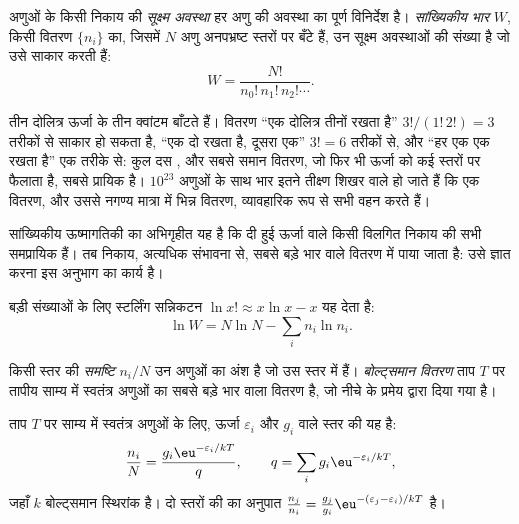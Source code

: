 \begin{definition}[सूक्ष्म अवस्था, सांख्यिकीय भार]\label{def:b3:partition-functions:microstate}
अणुओं के किसी निकाय की \emph{सूक्ष्म अवस्था} हर अणु की
अवस्था का पूर्ण विनिर्देश है। \emph{सांख्यिकीय भार} $W$, किसी वितरण
$\{n_i\}$ का, जिसमें $N$ अणु अनपभ्रष्ट स्तरों पर बँटे हैं,
उन सूक्ष्म अवस्थाओं की संख्या है जो उसे साकार करती हैं:
\[
  W = \frac{N!}{n_0!\,n_1!\,n_2!\cdots}.
\]
\end{definition}

\begin{example}[तीन दोलित्रों में तीन क्वांटम]\label{ex:b3:partition-functions:three-quanta}
तीन दोलित्र ऊर्जा के तीन क्वांटम बाँटते हैं। वितरण ``एक
दोलित्र तीनों रखता है'' $3!/(1!\,2!) = 3$ तरीकों से साकार हो सकता है, ``एक
दो रखता है, दूसरा एक'' $3! = 6$ तरीकों से, और ``हर एक एक रखता है'' एक तरीके से:
कुल दस , और सबसे समान वितरण, जो फिर भी ऊर्जा को
कई स्तरों पर फैलाता है, सबसे प्रायिक है। $10^{23}$ अणुओं के साथ
भार इतने तीक्ष्ण शिखर वाले हो जाते हैं कि एक वितरण, और उससे नगण्य मात्रा में
भिन्न वितरण, व्यावहारिक रूप से सभी  वहन करते हैं।
\end{example}

\begin{remark}
सांख्यिकीय ऊष्मागतिकी का अभिगृहीत यह है कि दी हुई ऊर्जा वाले किसी विलगित
निकाय की सभी  समप्रायिक हैं। तब निकाय, अत्यधिक संभावना से,
सबसे बड़े भार वाले वितरण में पाया जाता है: उसे ज्ञात करना
इस अनुभाग का कार्य है।
\end{remark}

बड़ी संख्याओं के लिए स्टर्लिंग सन्निकटन $\ln x! \approx x\ln x - x$ यह देता है:
\[
  \ln W = N\ln N - \sum_i n_i\ln n_i .
\]

\begin{definition}\label{def:b3:partition-functions:boltzmann}
किसी स्तर की \emph{समष्टि} $n_i/N$ उन अणुओं का अंश है जो
उस स्तर में हैं। \emph{बोल्ट्समान वितरण}
ताप $T$ पर तापीय साम्य में स्वतंत्र अणुओं का सबसे बड़े भार वाला वितरण है,
जो नीचे के प्रमेय द्वारा दिया गया है।
\end{definition}

\begin{theorem}[बोल्ट्समान वितरण]\label{thm:b3:partition-functions:boltzmann}
ताप $T$ पर साम्य में स्वतंत्र अणुओं के लिए, ऊर्जा $\varepsilon_i$ और
 $g_i$ वाले स्तर की  यह है:
\[
  \frac{n_i}{N} = \frac{g_i\eu^{-\varepsilon_i/kT}}{q},
  \qquad q = \sum_i g_i\eu^{-\varepsilon_i/kT},
\]
जहाँ $k$ बोल्ट्समान स्थिरांक है। दो स्तरों की  का अनुपात
$\frac{n_j}{n_i} = \frac{g_j}{g_i}\eu^{-(\varepsilon_j - \varepsilon_i)/kT}$ है।
\end{theorem}

